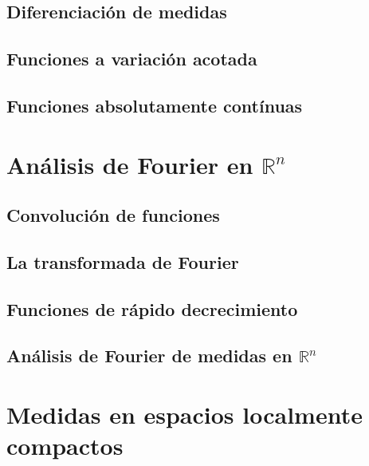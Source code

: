 \documentclass[12pt,]{krantz}
\theoremstyle{definition}
\theoremstyle{definition}
\theoremstyle{definition}
\theoremstyle{remark}
\begin{document}
\section{Diferenciación de medidas}\label{diferenciacion-de-medidas}

\section{Funciones a variación
acotada}\label{funciones-a-variacion-acotada-1}

\section{Funciones absolutamente
contínuas}\label{funciones-absolutamente-continuas}

\chapter{\texorpdfstring{Análisis de Fourier en
\(\mathbb{R}^n\)}{Análisis de Fourier en \textbackslash{}mathbb\{R\}\^{}n}}\label{analisis-de-fourier-en-mathbbrn}

\section{Convolución de funciones}\label{convolucion-de-funciones}

\section{La transformada de Fourier}\label{la-transformada-de-fourier}

\section{Funciones de rápido
decrecimiento}\label{funciones-de-rapido-decrecimiento}

\section{\texorpdfstring{Análisis de Fourier de medidas en
\(\mathbb{R}^n\)}{Análisis de Fourier de medidas en \textbackslash{}mathbb\{R\}\^{}n}}\label{analisis-de-fourier-de-medidas-en-mathbbrn}

\chapter{Medidas en espacios localmente
compactos}\label{medidas-en-espacios-localmente-compactos}
\end{document}
